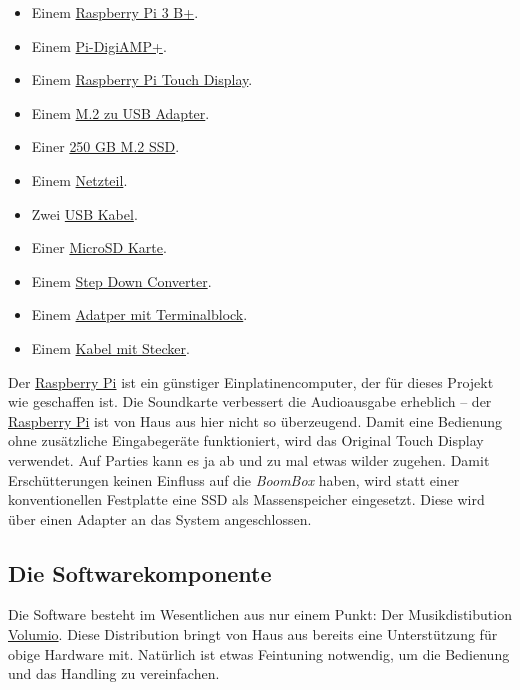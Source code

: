 \documentclass[12pt,a4paper]{article}
\newcommand{\bb}{\textit{BoomBox}}
\newcommand{\rpi}{\href{https://www.raspberrypi.org/}{Raspberry Pi}}
\newcommand{\vol}{\href{https://volumio.org/}{Volumio}}
\begin{document}
\begin{itemize}
    \item Einem \href{https://www.raspberrypi.org/products/raspberry-pi-3-model-b-plus/}{\rpi{} 3 B+}.
    \item Einem \href{http://iqaudio.co.uk/hats/9-pi-digiamp.html}{Pi-DigiAMP+}.
    \item Einem \href{https://www.raspberrypi.org/products/raspberry-pi-touch-display/}{\rpi{} Touch Display}.
    \item Einem \href{https://www.conrad.de/de/m2-sata-ssd-erweiterungs-platine-fuer-den-raspberry-pi-1487097.html}{M.2 zu USB Adapter}.
    \item Einer \href{https://www.wd.com/de-de/products/internal-ssd/wd-blue-3d-nand-sata-ssd.html}{250 GB M.2 SSD}.
    \item Einem \href{https://www.amazon.de/gp/product/B002JIGJ4M/ref=ppx_yo_dt_b_asin_title_o04_s00?ie=UTF8&psc=1}{Netzteil}.
    \item Zwei \href{https://www.amazon.de/gp/product/B01GJC4WRO/ref=ppx_yo_dt_b_asin_title_o07_s00?ie=UTF8&psc=1}{USB Kabel}.
    \item Einer \href{https://www.amazon.de/gp/product/B073S9SFK2/ref=ppx_yo_dt_b_asin_title_o07_s00?ie=UTF8&psc=1}{MicroSD Karte}.
    \item Einem \href{https://www.amazon.de/gp/product/B07KFFNBLJ/ref=ppx_yo_dt_b_asin_title_o03_s00?ie=UTF8&psc=1}{Step Down Converter}.
    \item Einem \href{https://www.amazon.de/gp/product/B071KVWQKY/ref=ppx_yo_dt_b_asin_title_o05_s00?ie=UTF8&psc=1}{Adatper mit Terminalblock}.
    \item Einem \href{https://www.amazon.de/gp/product/B00A6QKIEQ/ref=ppx_yo_dt_b_asin_title_o06_s00?ie=UTF8&psc=1}{Kabel mit Stecker}.
\end{itemize}

Der \rpi{} ist ein günstiger Einplatinencomputer, der für dieses Projekt wie geschaffen ist. Die Soundkarte verbessert die Audioausgabe erheblich -- der \rpi{}
ist von Haus aus hier nicht so überzeugend. Damit eine Bedienung ohne zusätzliche Eingabegeräte funktioniert, wird das Original Touch Display verwendet. Auf
Parties kann es ja ab und zu mal etwas wilder zugehen. Damit Erschütterungen keinen Einfluss auf die \bb{} haben, wird statt einer konventionellen Festplatte
eine SSD als Massenspeicher eingesetzt. Diese wird über einen Adapter an das System angeschlossen.

\subsection{Die Softwarekomponente}
Die Software besteht im Wesentlichen aus nur einem Punkt: Der Musikdistibution \vol{}. Diese Distribution bringt von Haus
aus bereits eine Unterstützung für obige Hardware mit. Natürlich ist etwas Feintuning notwendig, um die Bedienung und das Handling zu vereinfachen.
\end{document}
